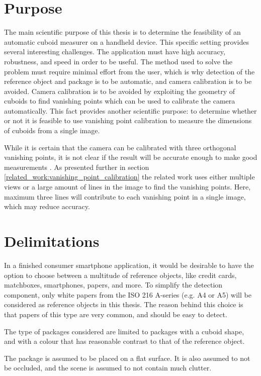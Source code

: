 \section{Purpose} 
The main scientific purpose of this thesis is to determine the feasibility of an automatic cuboid measurer on a handheld device.
This specific setting provides several interesting challenges.
The application must have high accuracy, robustness, and speed in order to be useful.
The method used to solve the problem must require minimal effort from the user, which is why detection of the reference object and package is to be automatic, and camera calibration is to be avoided.
Camera calibration is to be avoided by exploiting the geometry of cuboids to find vanishing points which can be used to calibrate the camera automatically.
This fact provides another scientific purpose: to determine whether or not it is feasible to use vanishing point calibration to measure the dimensions of cuboids from a single image.

While it is certain that the camera can be calibrated with three orthogonal vanishing points, it is not clear if the result will be accurate enough to make good measurements \cite[p. 195-226]{hartley-zisserman}.
As presented further in section \ref{related_work:vanishing_point_calibration} the related work uses either multiple views or a large amount of lines in the image to find the vanishing points.
Here, maximum three lines will contribute to each vanishing point in a single image, which may reduce accuracy.

\section{Delimitations} \label{introduction:delimitations}
In a finished consumer smartphone application, it would be desirable to have the option to choose between a multitude of reference objects, like credit cards, matchboxes, smartphones, papers, and more. 
To simplify the detection component, only white papers from the ISO 216 A-series (e.g. A4 or A5) will be considered as reference objects in this thesis.
The reason behind this choice is that papers of this type are very common, and should be easy to detect.

The type of packages considered are limited to packages with a cuboid shape, and with a colour that has reasonable contrast to that of the reference object.

The package is assumed to be placed on a flat surface.
It is also assumed to not be occluded, and the scene is assumed to not contain much clutter.

